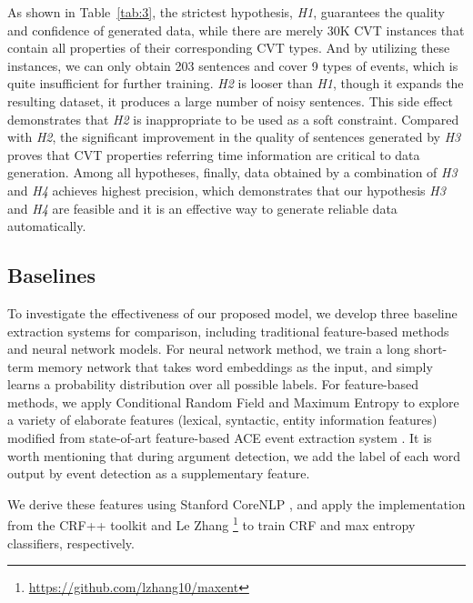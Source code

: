\documentclass{article}
\begin{document}
As shown in Table~\ref{tab:3}, the strictest hypothesis, \emph{H1}, guarantees the quality and confidence of generated data, while there are merely 30K CVT instances that contain all properties of their corresponding CVT types. And by utilizing these instances, we can only obtain 203 sentences and cover 9 types of events, which is quite insufficient for further training. \emph{H2} is looser than \emph{H1}, though it expands the resulting dataset, it produces a large number of noisy sentences. This side effect  demonstrates that \emph{H2} is inappropriate to be used as a soft constraint. Compared with \emph{H2}, the significant improvement in the quality of sentences generated by \emph{H3} proves that CVT properties referring time information are critical to data generation. Among all hypotheses, finally, data obtained by a combination of \emph{H3} and \emph{H4} achieves highest precision, which demonstrates that our hypothesis \emph{H3} and \emph{H4} are feasible and it is an effective way to generate reliable data automatically.

\subsection{Baselines}
To investigate the effectiveness of our proposed model, we develop three baseline extraction systems for comparison, including traditional feature-based methods and neural network models. For neural network method, we train a long short-term memory network that takes word embeddings as the input, and simply learns a probability distribution over all possible labels. For feature-based methods, we apply Conditional Random Field \cite{lafferty2001conditional} and Maximum Entropy \cite{berger1996maximum} to explore a variety of elaborate features (lexical, syntactic, entity information features) modified from state-of-art feature-based ACE event extraction system \cite{li2013joint}. It is worth mentioning that during argument detection, we add the label of each word output by event detection as a supplementary feature.

We derive these features using Stanford CoreNLP \cite{manning2014stanford}, and apply the implementation from the CRF++ toolkit \cite{kudo2005crf++} and Le Zhang \footnote{\url{https://github.com/lzhang10/maxent}} to train CRF and max entropy classifiers, respectively.
\end{document}
